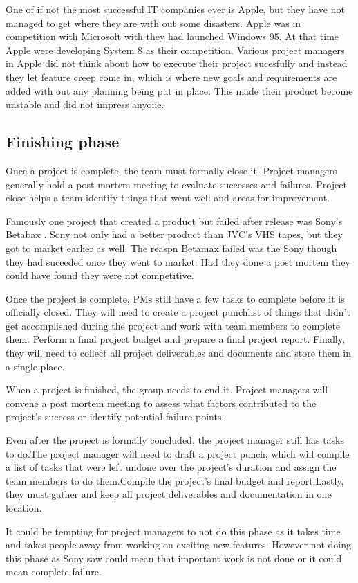 \documentclass{article}
\begin{document}
One of if not the most successful IT companies ever is Apple, but they have not managed to get where they are with out some disasters. Apple was in competition with Microsoft with they had launched Windows 95. At that time Apple were developing System 8 as their competition. Various project managers in Apple did not think about how to execute their project sucesfully and instead they let feature creep come in, which is where new goals and requirements are added with out any planning being put in place. This made their product become unstable and did not impress anyone. \cite{Sainsbury}

\subsection{Finishing phase}

Once a project is complete, the team must formally close it. Project managers generally hold a post mortem meeting to evaluate successes and failures. Project close helps a team identify things that went well and areas for improvement.

Famously one project that created a product but failed after release was Sony's Betabax \cite{betamax}. Sony not only had a better product than JVC's VHS tapes, but they got to market earlier as well. The reaspn Betamax failed was the Sony though they had suceeded once they went to market. Had they done a post mortem they could have found they were not competitive.

Once the project is complete, PMs still have a few tasks to complete before it is officially closed. They will need to create a project punchlist of things that didn’t get accomplished during the project and work with team members to complete them. Perform a final project budget and prepare a final project report. Finally, they will need to collect all project deliverables and  documents and store them in a single place. 

When a project is finished, the group needs to end it. Project managers will convene a post mortem meeting to assess what factors contributed to the project's success or identify potential failure points.

Even after the project is formally concluded, the project manager still has tasks to do.The project manager will need to draft a project punch, which will compile a list of tasks that were left undone over the project's duration and assign the team members to do them.Compile the project's final budget and report.Lastly, they must gather and keep all project deliverables and documentation in one location.    

It could be tempting for project managers to not do this phase as it takes time and takes people away from working on exciting new features. However not doing this phase as Sony saw could mean that important work is not done or it could mean complete failure.

\break

\end{document}
